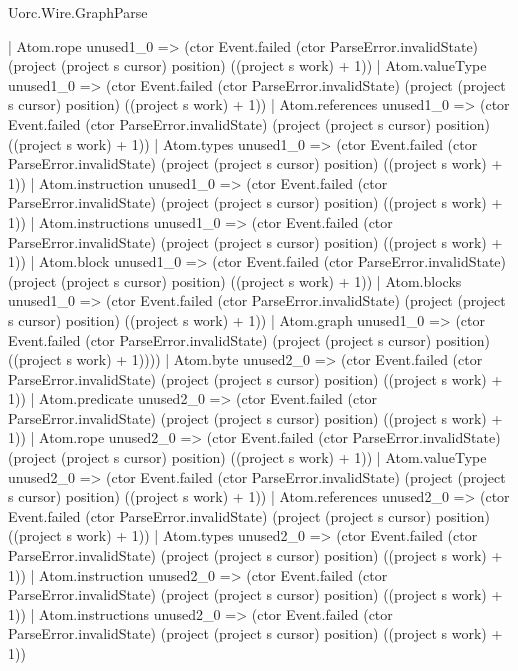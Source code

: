 \begin{lexlean}{Uorc.Wire.GraphParse}
\begin{semanticmodule}
{              | Atom.rope unused1_0 => (ctor Event.failed (ctor ParseError.invalidState) (project (project s cursor) position) ((project s work) + 1))
              | Atom.valueType unused1_0 => (ctor Event.failed (ctor ParseError.invalidState) (project (project s cursor) position) ((project s work) + 1))
              | Atom.references unused1_0 => (ctor Event.failed (ctor ParseError.invalidState) (project (project s cursor) position) ((project s work) + 1))
              | Atom.types unused1_0 => (ctor Event.failed (ctor ParseError.invalidState) (project (project s cursor) position) ((project s work) + 1))
              | Atom.instruction unused1_0 => (ctor Event.failed (ctor ParseError.invalidState) (project (project s cursor) position) ((project s work) + 1))
              | Atom.instructions unused1_0 => (ctor Event.failed (ctor ParseError.invalidState) (project (project s cursor) position) ((project s work) + 1))
              | Atom.block unused1_0 => (ctor Event.failed (ctor ParseError.invalidState) (project (project s cursor) position) ((project s work) + 1))
              | Atom.blocks unused1_0 => (ctor Event.failed (ctor ParseError.invalidState) (project (project s cursor) position) ((project s work) + 1))
              | Atom.graph unused1_0 => (ctor Event.failed (ctor ParseError.invalidState) (project (project s cursor) position) ((project s work) + 1))))
          | Atom.byte unused2_0 => (ctor Event.failed (ctor ParseError.invalidState) (project (project s cursor) position) ((project s work) + 1))
          | Atom.predicate unused2_0 => (ctor Event.failed (ctor ParseError.invalidState) (project (project s cursor) position) ((project s work) + 1))
          | Atom.rope unused2_0 => (ctor Event.failed (ctor ParseError.invalidState) (project (project s cursor) position) ((project s work) + 1))
          | Atom.valueType unused2_0 => (ctor Event.failed (ctor ParseError.invalidState) (project (project s cursor) position) ((project s work) + 1))
          | Atom.references unused2_0 => (ctor Event.failed (ctor ParseError.invalidState) (project (project s cursor) position) ((project s work) + 1))
          | Atom.types unused2_0 => (ctor Event.failed (ctor ParseError.invalidState) (project (project s cursor) position) ((project s work) + 1))
          | Atom.instruction unused2_0 => (ctor Event.failed (ctor ParseError.invalidState) (project (project s cursor) position) ((project s work) + 1))
          | Atom.instructions unused2_0 => (ctor Event.failed (ctor ParseError.invalidState) (project (project s cursor) position) ((project s work) + 1))
}
\end{semanticmodule}
\end{lexlean}
